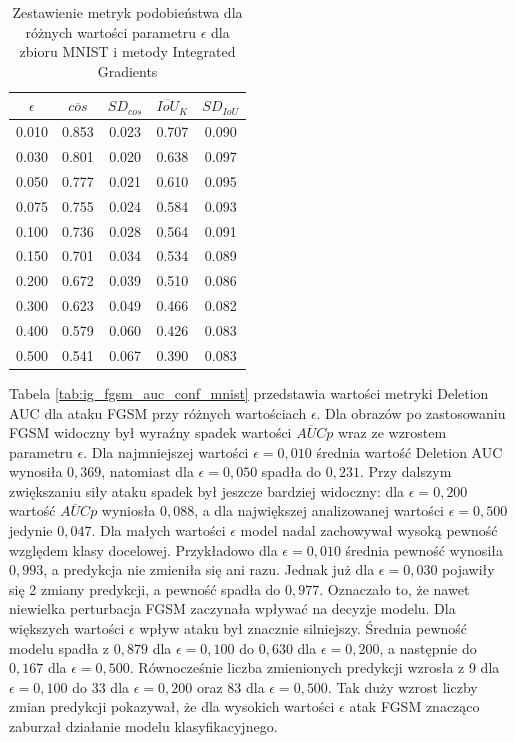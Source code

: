\begin{table}[H]
    \centering 
    \caption{Zestawienie metryk podobieństwa dla różnych wartości parametru \(\epsilon\) dla zbioru MNIST i metody Integrated Gradients} 
    \label{tab:ig_fgsm_cos_topk_mnist} 
    \begin{tabular}{ccccc} 
    \toprule $\epsilon$ & $\overline{cos}$ & $SD_{cos}$ & $\overline{IoU}_{K}$ & $SD_{IoU}$ \\ 
    \midrule 
    0.010 & 0.853 & 0.023 & 0.707 & 0.090 \\
    0.030 & 0.801 & 0.020 & 0.638 & 0.097 \\
    0.050 & 0.777 & 0.021 & 0.610 & 0.095 \\ 
    0.075 & 0.755 & 0.024 & 0.584 & 0.093 \\
    0.100 & 0.736 & 0.028 & 0.564 & 0.091 \\
    0.150 & 0.701 & 0.034 & 0.534 & 0.089 \\ 
    0.200 & 0.672 & 0.039 & 0.510 & 0.086 \\ 
    0.300 & 0.623 & 0.049 & 0.466 & 0.082 \\ 
    0.400 & 0.579 & 0.060 & 0.426 & 0.083 \\
    0.500 & 0.541 & 0.067 & 0.390 & 0.083 \\ 
    \bottomrule 
    \end{tabular} 
\end{table}

Tabela \ref{tab:ig_fgsm_auc_conf_mnist} przedstawia wartości metryki Deletion AUC dla ataku FGSM przy różnych wartościach $\epsilon$. Dla obrazów po zastosowaniu FGSM widoczny był wyraźny spadek wartości $\overline{AUC}{p}$ wraz ze wzrostem parametru $\epsilon$. Dla najmniejszej wartości $\epsilon = 0{,}010$ średnia wartość Deletion AUC wynosiła $0{,}369$, natomiast dla $\epsilon = 0{,}050$ spadła do $0{,}231$. Przy dalszym zwiększaniu siły ataku spadek był jeszcze bardziej widoczny: dla $\epsilon = 0{,}200$ wartość $\overline{AUC}{p}$ wyniosła $0{,}088$, a dla największej analizowanej wartości $\epsilon = 0{,}500$ jedynie $0{,}047$. Dla małych wartości $\epsilon$ model nadal zachowywał wysoką pewność względem klasy docelowej. Przykładowo dla $\epsilon = 0{,}010$ średnia pewność wynosiła $0{,}993$, a predykcja nie zmieniła się ani razu. Jednak już dla $\epsilon = 0{,}030$ pojawiły się 2 zmiany predykcji, a pewność spadła do $0{,}977$. Oznaczało to, że nawet niewielka perturbacja FGSM zaczynała wpływać na decyzje modelu. Dla większych wartości $\epsilon$ wpływ ataku był znacznie silniejszy. Średnia pewność modelu spadła z $0{,}879$ dla $\epsilon = 0{,}100$ do $0{,}630$ dla $\epsilon = 0{,}200$, a następnie do $0{,}167$ dla $\epsilon = 0{,}500$. Równocześnie liczba zmienionych predykcji wzrosła z 9 dla $\epsilon = 0{,}100$ do 33 dla $\epsilon = 0{,}200$ oraz 83 dla $\epsilon = 0{,}500$. Tak duży wzrost liczby zmian predykcji pokazywał, że dla wysokich wartości $\epsilon$ atak FGSM znacząco zaburzał działanie modelu klasyfikacyjnego.

